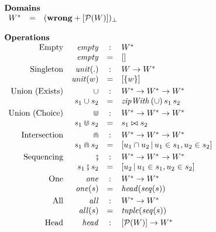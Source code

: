 \documentclass[acmsmall,review,dvipsnames]{acmart}
\newcommand{\Value}{W}
\newcommand{\setform}[1]{\left\{ #1 \right\}}
\newcommand{\mtype}{\Value^{*}}
\newcommand{\mempty}{\mathit{empty}}
\newcommand{\munit}{\mathit{unit}}
\newcommand{\munits}[1]{\munit(#1)}
\newcommand{\mintersect}{\Cap}
\newcommand{\munion}{\Cup}
\newcommand{\msemi}{\fatsemi}
\newcommand{\mone}{\mathit{one}}
\newcommand{\mall}{\mathit{all}}
\newcommand{\mtag}{\mathit{tag}}
\newcommand{\mlift}[1]{#1_{\bot}}
\newcommand{\powerset}[1]{{\mathcal P}(#1)}
\newcommand{\wrong}{\mathbf{wrong}}
\begin{document}
\begin{figure}
$$
\begin{array}{l}
\text{\bf Domains} \\
\begin{array}{rcll}
\mtype & = & \mlift{(\wrong + [\powerset{W}])} \\
\end{array} \\
\\
\text{\bf Operations} \\
\begin{array}{rrcll}
\text{Empty}        & \mempty & : &  \mtype \\
    & \mempty & = & [] \\[1mm]
\text{Singleton}    & \munits{.} & : & \Value \rightarrow \mtype \\
     & \munits{w} & = & [\setform{ w }] \\[1mm]
\text{Union (Exists)}        & \cup & : & \mtype \rightarrow \mtype \rightarrow \mtype \\
 &  s_1 \cup s_2 & = & \mathit{zipWith} \, (\cup) \, s_1 \, s_2 \\[1mm]
\text{Union (Choice)}        & \munion & : & \mtype \rightarrow \mtype \rightarrow \mtype \\
 &  s_1 \munion s_2 & = & s_1 \bowtie s_2 \\[1mm]
\text{Intersection} & \mintersect & : & \mtype \rightarrow \mtype \rightarrow \mtype \\
 &  s_1 \mintersect s_2 & = & [ u_1 \cap u_2 \, \vert \, u_1 \in s_1, u_2 \in s_2 ] \\[1mm]
\text{Sequencing} & \msemi & : & \mtype \rightarrow \mtype \rightarrow \mtype \\
&  s_1 \msemi s_2 & = & [ u_2 \, \vert \, u_1 \in s_1, u_2 \in s_2 ] \\[1mm]
\text{One}  & \mone & : & \mtype \rightarrow \mtype \\
& \mone(s) & = & \shead{(\sseq{(s)})} \\[1mm]
\text{All}  & \mall & : & \mtype \rightarrow \mtype \\
& \mall(s) & = & \stuple{(\sseq{(s)})} \\[1mm]
\text{Head}  & \shead & : & [\powersett{W}] \rightarrow \mtype \\

\end{array}
\end{array}$$
\end{figure}
\end{document}

